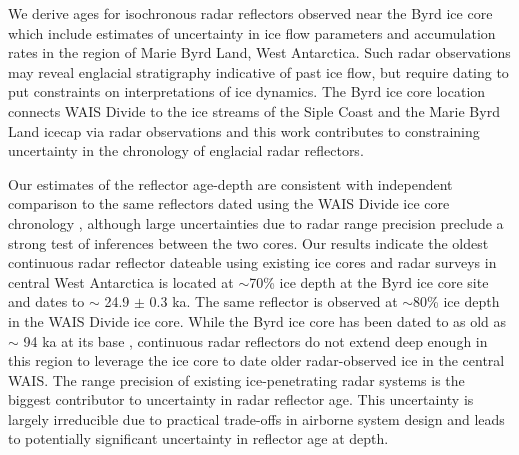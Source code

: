 

We derive ages for isochronous radar reflectors observed near the Byrd ice core which include estimates of uncertainty in ice flow parameters and accumulation rates in the region of Marie Byrd Land, West Antarctica. Such radar observations may reveal englacial stratigraphy indicative of past ice flow, but require dating to put constraints on interpretations of ice dynamics. The Byrd ice core location connects WAIS Divide to the ice streams of the Siple Coast and the Marie Byrd Land icecap via radar observations and this work contributes to constraining uncertainty in the chronology of englacial radar reflectors.

Our estimates of the reflector age-depth are consistent with independent comparison to the same reflectors dated using the WAIS Divide ice core chronology \citep{buizert2015}, although large uncertainties due to radar range precision preclude a strong test of inferences between the two cores. Our results indicate the oldest continuous radar reflector dateable using existing ice cores and radar surveys in central West Antarctica is located at $\sim$70\% ice depth at the Byrd ice core site and dates to $\sim$ 24.9 $\pm$ 0.3 ka. The same reflector is observed at $\sim$80\% ice depth in the WAIS Divide ice core. While the Byrd ice core has been dated to as old as $\sim$ 94 ka at its base \citep{blunier2001}, continuous radar reflectors do not extend deep enough in this region to leverage the ice core to date older radar-observed ice in the central WAIS. The range precision of existing ice-penetrating radar systems is the biggest contributor to uncertainty in radar reflector age. This uncertainty is largely irreducible due to practical trade-offs in airborne system design and leads to potentially significant uncertainty in reflector age at depth. 







